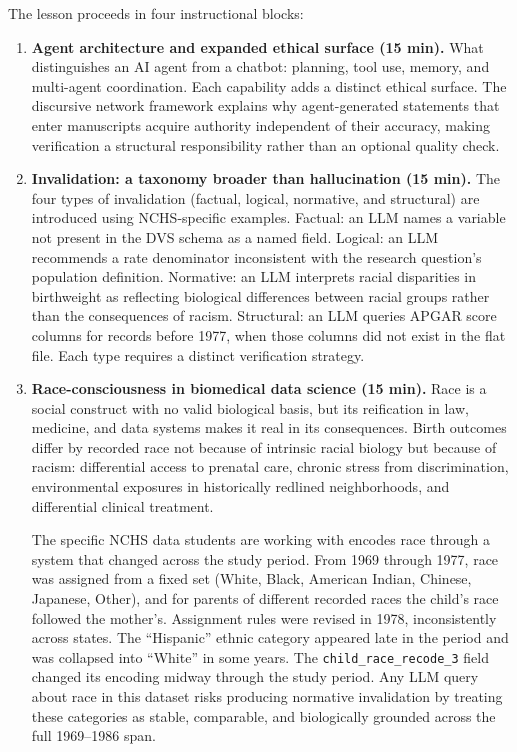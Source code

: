 The lesson proceeds in four instructional blocks:

\begin{enumerate}
    \item \textbf{Agent architecture and expanded ethical surface
    (15 min).} What distinguishes an AI agent from a chatbot:
    planning, tool use, memory, and multi-agent coordination.
    Each capability adds a distinct ethical surface. The discursive
    network framework explains why agent-generated statements that
    enter manuscripts acquire authority independent of their accuracy,
    making verification a structural responsibility rather than an
    optional quality check.

    \item \textbf{Invalidation: a taxonomy broader than hallucination
    (15 min).} The four types of invalidation (factual, logical,
    normative, and structural) are introduced using NCHS-specific
    examples. Factual: an LLM names a variable not present in the
    DVS schema as a named field. Logical: an LLM recommends a rate
    denominator inconsistent with the research question's population
    definition. Normative: an LLM interprets racial disparities in
    birthweight as reflecting biological differences between racial
    groups rather than the consequences of racism. Structural: an
    LLM queries APGAR score columns for records before 1977, when
    those columns did not exist in the flat file. Each type requires
    a distinct verification strategy.

    \item \textbf{Race-consciousness in biomedical data science
    (15 min).} Race is a social construct with no valid biological
    basis, but its reification in law, medicine, and data systems
    makes it real in its consequences. Birth outcomes differ by
    recorded race not because of intrinsic racial biology but because
    of racism: differential access to prenatal care, chronic stress
    from discrimination, environmental exposures in historically
    redlined neighborhoods, and differential clinical treatment.

    The specific NCHS data students are working with encodes race
    through a system that changed across the study period. From 1969
    through 1977, race was assigned from a fixed set (White, Black,
    American Indian, Chinese, Japanese, Other), and for parents
    of different recorded races the child's race followed the
    mother's. Assignment rules were revised in 1978, inconsistently
    across states. The ``Hispanic'' ethnic category appeared late
    in the period and was collapsed into ``White'' in some years.
    The \texttt{child\_race\_recode\_3} field changed its encoding
    midway through the study period. Any LLM query about race in
    this dataset risks producing normative invalidation by treating
    these categories as stable, comparable, and biologically grounded
    across the full 1969--1986 span.


\end{enumerate}
